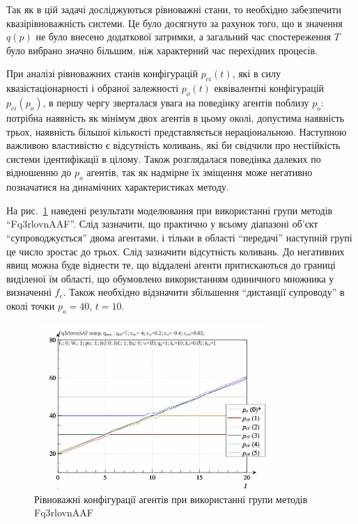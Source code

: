 Так як в цій задачі досліджуються рівноважні стани, то
необхідно забезпечити квазірівноважність системи. Це було
досягнуто за рахунок того, що в значення
$q(p)$ не було внесено додаткової затримки, а загальний час
спостереження
$T$ було вибрано значно більшим, ніж характерний час
перехідних процесів.

При аналізі рівноважних станів конфігурацій
$p_{ci}(t)$, які в силу квазістаціонарності і обраної залежності
$p_o(t)$ еквівалентні конфігурацій
$p_{ci}(p_o)$, в першу чергу зверталася увага на поведінку агентів
поблизу
$p_o$: потрібна наявність як мінімум двох агентів в цьому околі,
допустима наявність трьох, наявність більшої кількості
представляється нераціональною. Наступною важливою властивістю
є відсутність коливань, які би свідчили про нестійкість системи
ідентифікації в цілому. Також розглядалася поведінка далеких
по відношенню до
$p_o$ агентів, так як надмірне їх зміщення може негативно
позначатися на динамічних характеристиках методу.

На рис.~\ref{atu:f:qls_ramp_Fq3rlovnAAF} наведені результати моделювання при використанні групи методів
``Fq3rlovnAAF''. Слід зазначити, що практично у всьому діапазоні об'єкт
``супроводжується'' двома агентами, і тільки в області ``передачі'' наступній
групі це число зростає до трьох. Слід зазначити відсутність коливань. До
негативних явищ можна буде віднести те, що віддалені агенти притискаються до
границі виділеної їм області, що обумовлено використанням одиничного множника у
визначенні $f_e$. Також необхідно відзначити збільшення
``дистанції супроводу'' в околі точки $p_o = 40$, $t = 10$.

\begin{figure}[htb!]
  \begin{center}
    \includegraphics[width=0.8\textwidth]{p/ramp/qls-p_t_pi_Fq3rlovnAAF_ramp.png}
  \end{center}
  \caption{Рівноважні конфігурації агентів при використанні групи методів Fq3rlovnAAF}
  \label{atu:f:qls_ramp_Fq3rlovnAAF}
\end{figure}

